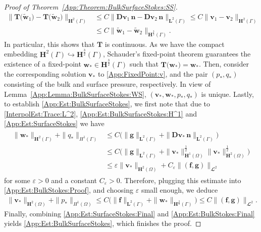 \documentclass[10pt,reqno]{amsart}
\theoremstyle{remark}
\numberwithin{equation}{section}
\newcommand{\norm}[1]{\| #1 \|}
\newcommand{\n}{\mathbf{n}}
\newcommand{\bv}{\mathbf{v}}
\newcommand{\bw}{\mathbf{w}}
\newcommand{\D}{\mathbf{D}}
\newcommand{\f}{\mathbf{f}}
\newcommand{\g}{\mathbf{g}}
\newcommand{\emb}{\hookrightarrow}
\newcommand{\Om}{\Omega}
\newcommand{\Ga}{\Gamma}
\begin{document}
\begin{proof}[Proof of Theorem~\ref{App:Theorem:BulkSurfaceStokes:SS}]
    \begin{align*}
        \norm{\mathbf{T}\big(\widetilde{\bw}_1) - \mathbf{T}\big(\widetilde{\bw}_2)}_{\mathbf{H}^2(\Ga)} &\leq C\norm{\D\bv_1\,\n - \D\bv_2\,\n}_{\mathbf{L}^2(\Ga)} \leq C\norm{\bv_1 - \bv_2}_{\mathbf{H}^2(\Ga)} \\
        &\leq C\norm{\widetilde{\bw}_1 - \widetilde{\bw}_2}_{\mathbf{H}^{\frac32}(\Ga)}.
    \end{align*}
    In particular, this shows that $\mathbf{T}$ is continuous. As we have the compact embedding $\mathbf{H}^2(\Ga)\emb\mathbf{H}^{\frac32}(\Ga)$, Schauder's fixed-point theorem guarantees the existence of a fixed-point $\bw_\ast\in\mathbf{H}^{\frac32}(\Ga)$ such that $\mathbf{T}\big(\bw_\ast\big) = \bw_\ast$. Then, consider the corresponding solution $\bv_\ast$ to \eqref{App:FixedPoint:v}, and the pair $(p_\ast,q_\ast)$ consisting of the bulk and surface pressure, respectively. In view of Lemma~\ref{App:Lemma:BulkSurfaceStokes:WS}, $(\bv_\ast,\bw_\ast,p_\ast,q_\ast)$ is unique.
    Lastly, to establish \eqref{App:Est:BulkSurfaceStokes}, we first note that due to \eqref{InterpolEst:Trace:L^2}, \eqref{App:Est:BulkSurfaceStokes:H^1} and \eqref{App:Est:SurfaceStokes} we have
    \begin{align}\label{App:Est:SurfaceStokes:Final}
        \begin{split}
            \norm{\bw_\ast}_{\mathbf{H}^2(\Ga)} + \norm{q_\ast}_{H^1(\Ga)} &\leq C\big(\norm{\g}_{\mathbf{L}^2(\Ga)} + \norm{\D\bv_\ast\,\n}_{\mathbf{L}^2(\Ga)}\big) \\
            &\leq C\big(\norm{\g}_{\mathbf{L}^2(\Ga)} + \norm{\bv_\ast}_{\mathbf{H}^1(\Om)}^{\frac12}\norm{\bv_\ast}_{\mathbf{H}^2(\Om)}^{\frac12}\big) \\
            &\leq \varepsilon\norm{\bv_\ast}_{\mathbf{H}^2(\Om)} + C_\varepsilon\norm{(\f,\g)}_{\mathbfcal{L}^2}
        \end{split}
    \end{align}
    for some $\varepsilon > 0$ and a constant $C_\varepsilon > 0$. Therefore, plugging this estimate into \eqref{App:Est:BulkStokes:Proof}, and choosing $\varepsilon$ small enough, we deduce
    \begin{align}\label{App:Est:BulkStokes:Final}
        \norm{\bv_\ast}_{\mathbf{H}^2(\Om)} + \norm{p_\ast}_{H^1(\Om)} \leq C\big(\norm{\f}_{\mathbf{L}^2(\Ga)} + \norm{\bw_\ast}_{\mathbf{H}^{\frac32}(\Ga)}\big) \leq C\norm{(\f,\g)}_{\mathbfcal{L}^2}.
    \end{align}
    Finally, combining \eqref{App:Est:SurfaceStokes:Final} and \eqref{App:Est:BulkStokes:Final} yields \eqref{App:Est:BulkSurfaceStokes}, which finishes the proof.
\end{proof}
\end{document}

